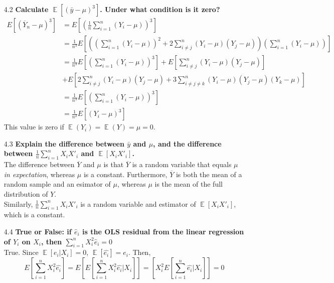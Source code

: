 \documentclass{article}
\newcommand{\oly}[1]{\overline{Y}_{#1}}
\newcommand{\est}[1]{\frac{1}{#1}\sum_{i=1}^{#1}}
\DeclareMathOperator{\E}{\mathbb{E}}%
\begin{document}
\begin{itemize}
	\pagebreak
	\item[4.2] \textbf{Calculate $\E\left[\left(\bar{y}-\mu\right)^3\right]$. Under what condition is it zero?} \\
		\begin{align*}
			E\left[(\oly{n}-\mu)^3\right] &= E\left[\left(\est{n}(Y_i-\mu)\right)^3\right] \\
				&= \frac{1}{n^3}E\left[\left(\left(\sum_{i=1}^n(Y_i-\mu)\right)^2 + 2\sum_{i\neq j}^n(Y_i-\mu)(Y_j-\mu)\right)\left(\sum_{i=1}^n(Y_i-\mu)\right)\right] \\
				&= \frac{1}{n^3}E\left[\left(\sum_{i=1}^n(Y_i-\mu)\right)^3 \right] + E\left[\sum_{i\neq j}^n(Y_i-\mu)(Y_j-\mu)\right] \\
				&+ E\left[2\sum_{i\neq j}^n(Y_i-\mu)(Y_j-\mu)+ 3\sum_{i\neq j\neq k}^n(Y_i-\mu)(Y_j-\mu)(Y_k-\mu)\right] \\
				&= \frac{1}{n^3}E\left[\left(\sum_{i=1}^n(Y_i-\mu)\right)^3 \right] \\
				&= \frac{1}{n^2}E\left[(Y_i-\mu)^3 \right] 
		\end{align*}
		This value is zero if $\E(Y_i)=\E(Y)=\mu=0$.
		
	\item[4.3] \textbf{Explain the difference between $\bar{y}$ and $\mu$, and the difference between ${\frac{1}{n}\sum_{i=1}^nX_iX'_i}$ and $\E[X_iX'_i]$.} \\
		The difference between $\overline{Y}$ and $\mu$ is that $\overline{Y}$ is a random variable that equals $\mu$ \textit{in expectation}, whereas $\mu$ is a constant. Furthermore, $\overline{Y}$ is both the mean of a random sample and an esimator of $\mu$, whereas $\mu$ is the mean of the full distribution of $Y$.
		\smallskip \\
		Similarly, $\frac{1}{n}\sum_{i=1}^n X_iX'_i$ is a random variable and estimator of $\E[X_iX'_i]$, which is a constant.
		
	\item[4.4] \textbf{True or False: if $\hat{e}_i$ is the OLS residual from the linear regression of $Y_i$ on $X_i$, then ${\sum_{i=1}^n X_i^2\hat{e}_i=0}$} \\
		True. Since $\E[e_i|X_i]=0$, $\E[\hat{e_i}]=e_i$. Then,
		\[
			E\left[\sum_{i=1}^n X_i^2\hat{e_i}\right] = E\left[E\left[\sum_{i=1}^n X_i^2\hat{e_i}|X_i\right]\right] = \left[X_i^2E\left[\sum_{i=1}^n \hat{e_i}|X_i\right]\right]
			=0
		\]
		

\end{itemize}
\end{document}
